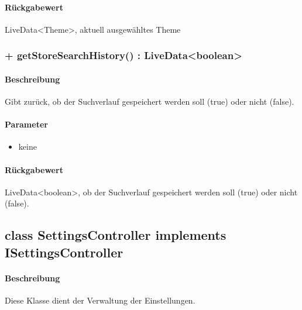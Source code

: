 \paragraph*{Rückgabewert}
LiveData<Theme>, aktuell ausgewähltes Theme

\subsubsection{+ getStoreSearchHistory() : LiveData<boolean>}%
\paragraph*{Beschreibung}
Gibt zurück, ob der Suchverlauf gespeichert werden soll (true) oder nicht (false).
\paragraph*{Parameter}
\begin{itemize}
    \item keine
\end{itemize}
\paragraph*{Rückgabewert}
LiveData<boolean>, ob der Suchverlauf gespeichert werden soll (true) oder nicht (false).


\subsection{class SettingsController implements ISettingsController}
\paragraph*{Beschreibung}
Diese Klasse dient der Verwaltung der Einstellungen.
